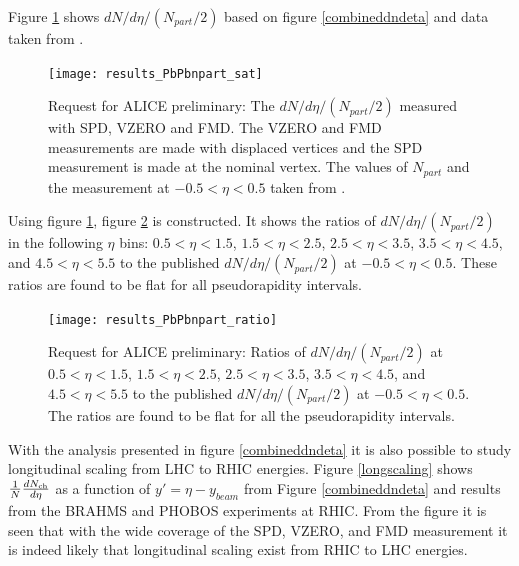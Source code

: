 \documentclass[11pt]{article}
\begin{document}
Figure \ref{dndetaoverNpart} shows $dN/d\eta/(N_{part}/2)$ based on
figure \ref{combineddndeta} and data taken from \cite{Aamodt:2010cz}.
\begin{figure}
  \centering
  \texttt{[image: results\_PbPbnpart\_sat]}
  \caption{Request for ALICE preliminary: The $dN/d\eta/(N_{part}/2)$
    measured with SPD, VZERO and FMD. The VZERO and FMD measurements
    are made with displaced vertices and the SPD measurement is made
    at the nominal vertex. The values of $N_{part}$ and the
    measurement at $-0.5<\eta<0.5$ taken from \cite{Aamodt:2010cz}.}
  \label{dndetaoverNpart}
\end{figure} 

Using figure \ref{dndetaoverNpart}, figure \ref{RatiodndetaoverNpart}
is constructed. It shows the ratios of $dN/d\eta/(N_{part}/2)$ in the
following $\eta$ bins: $0.5<\eta<1.5$, $1.5<\eta<2.5$, $2.5<\eta<3.5$,
$3.5<\eta<4.5$, and $4.5<\eta<5.5$ to the published
$dN/d\eta/(N_{part}/2)$ at $-0.5<\eta<0.5$. These ratios are found to
be flat for all pseudorapidity intervals.

\begin{figure}
  \centering
  \texttt{[image: results\_PbPbnpart\_ratio]}
  \caption{Request for ALICE preliminary: Ratios of
    $dN/d\eta/(N_{part}/2)$ at $0.5<\eta<1.5$, $1.5<\eta<2.5$,
    $2.5<\eta<3.5$, $3.5<\eta<4.5$, and $4.5<\eta<5.5$ to the
    published $dN/d\eta/(N_{part}/2)$ at $-0.5<\eta<0.5$. The ratios
    are found to be flat for all the pseudorapidity intervals.}
  \label{RatiodndetaoverNpart}
\end{figure} 

With the analysis presented in figure \ref{combineddndeta} it is also
possible to study longitudinal scaling from LHC to RHIC
energies. Figure \ref{longscaling} shows $\dndeta$ as a function of
$y'=\eta-y_{beam}$ from Figure \ref{combineddndeta} and results from
the BRAHMS\cite{Bearden:2001qq} and PHOBOS\cite{Alver:2010ck}
experiments at RHIC. From the figure it is seen that with the wide
coverage of the SPD, VZERO, and FMD measurement it is indeed likely
that longitudinal scaling exist from RHIC to LHC energies.
\end{document}
